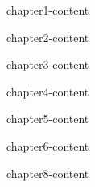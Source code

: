 


\onehalfspacing %
\let\footnote=\endnote %

\makeglossaries







\maketitle

\begin{frontmatter}

% 

% 

% 

% 



\cleardoublepage
{}
\begin{singlespace}
\tableofcontents
\end{singlespace}

\end{frontmatter}

\pagestyle{plain} %

{chapter1-content}

{chapter2-content}

{chapter3-content}

{chapter4-content}

{chapter5-content}

{chapter6-content}


{chapter8-content}


\printglossary
\printglossary[type=\acronymtype,title={Abbreviations}]

\theendnotes







